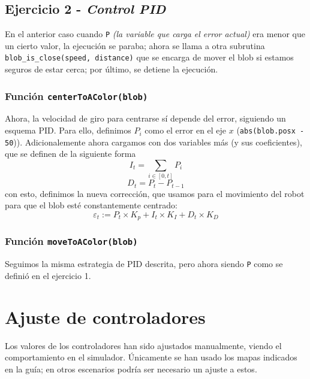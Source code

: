 \documentclass{article}
\begin{document}
\subsection*{Ejercicio 2 - \emph{Control PID}}
En el anterior caso cuando \texttt{P} \textit{(la variable que carga el error actual)} era menor que un cierto valor, la ejecución se paraba; ahora se llama a otra subrutina \texttt{blob\_is\_close(speed, distance)} que se encarga de mover el blob si estamos seguros de estar cerca; por último, se detiene la ejecución. 
\subsubsection*{Función \texttt{centerToAColor(blob)}}
Ahora, la velocidad de giro para centrarse sí depende del error, siguiendo un esquema PID. Para ello, definimos $P_i$ como el error en el eje $x$ (\texttt{abs(blob.posx - 50})). Adicionalemente ahora cargamos con dos variables más (y sus coeficientes), que se definen de la siguiente forma \[I_t = \sum_{i \in [0,t]} P_i \] \[D_t = P_t - P_{t-1}\] con esto, definimos la nueva corrección, que usamos para el movimiento del robot para que el blob esté constantemente centrado: \[\varepsilon_t := P_t\times K_p + I_t \times K_I + D_t \times K_D\]
\subsubsection*{Función \texttt{moveToAColor(blob)}}
Seguimos la misma estrategia de PID descrita, pero ahora siendo \texttt{P} como se definió en el ejercicio 1. 
\section*{Ajuste de controladores}
Los valores de los controladores han sido ajustados manualmente, viendo el comportamiento en el simulador. Únicamente se han usado los mapas indicados en la guía; en otros escenarios podría ser necesario un ajuste a estos.
\end{document}
